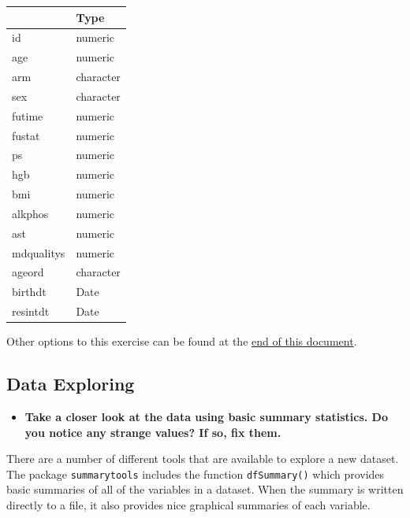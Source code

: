 \documentclass[
]{book}
\providecommand{\tightlist}{%
  \setlength{\itemsep}{0pt}\setlength{\parskip}{0pt}}
\begin{document}
\begin{tabular}{l|l}
\hline
  & Type\\
\hline
id & numeric\\
\hline
age & numeric\\
\hline
arm & character\\
\hline
sex & character\\
\hline
futime & numeric\\
\hline
fustat & numeric\\
\hline
ps & numeric\\
\hline
hgb & numeric\\
\hline
bmi & numeric\\
\hline
alkphos & numeric\\
\hline
ast & numeric\\
\hline
mdqualitys & numeric\\
\hline
ageord & character\\
\hline
birthdt & Date\\
\hline
resintdt & Date\\
\hline
\end{tabular}

Other options to this exercise can be found at the \protect\hyperlink{alt-import}{end of this document}.

\hypertarget{data-exploring}{%
\subsection{Data Exploring}\label{data-exploring}}

\begin{itemize}
\tightlist
\item
  \textbf{Take a closer look at the data using basic summary statistics. Do you notice any strange values? If so, fix them.}
\end{itemize}

There are a number of different tools that are available to explore a new dataset. The package \texttt{summarytools} includes the function \texttt{dfSummary()} which provides basic summaries of all of the variables in a dataset. When the summary is written directly to a file, it also provides nice graphical summaries of each variable.
\end{document}
